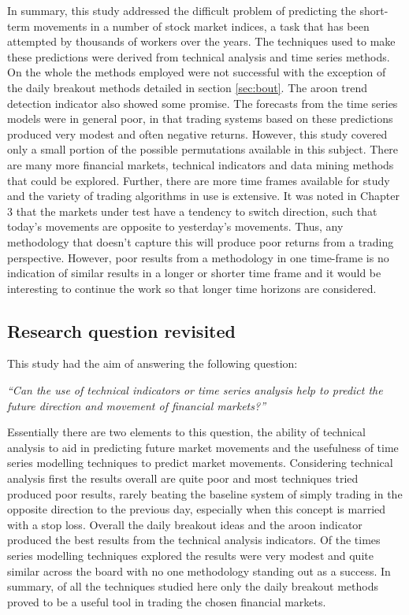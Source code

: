 In summary, this study addressed the difficult problem of predicting the short-term movements in a number of stock market indices, a task that has been attempted by thousands of workers over the years. The techniques used to make these predictions were derived from technical analysis and time series methods. On the whole the methods employed were not successful with the exception of the daily breakout methods detailed in section \ref{sec:bout}. The aroon trend detection indicator also showed some promise. The forecasts from the time series models were in general poor, in that trading systems based on these predictions produced very modest and often negative returns. However, this study covered only a small portion of the possible permutations available in this subject. There are many more financial markets, technical indicators and data mining methods that could be explored. Further, there are more time frames available for study and the variety of trading algorithms in use is extensive. It was noted in Chapter 3 that the markets under test have a tendency to switch direction, such that today's movements are opposite to yesterday's movements. Thus, any methodology that doesn't capture this will produce poor returns from a trading perspective. However, poor results from a methodology in one time-frame is no indication of similar results in a longer or shorter time frame and it would be interesting to continue the work so that longer time horizons are considered.

\subsection{Research question revisited}
This study had the aim of answering the following question:

\textit{\textquotedblleft Can the use of technical indicators or time series analysis help to predict the future direction and movement of financial markets?\textquotedblright}

Essentially there are two elements to this question, the ability of technical analysis to aid in predicting future market movements and the usefulness of time series modelling techniques to predict market movements. Considering technical analysis first the results overall are quite poor and most techniques tried produced poor results, rarely beating the baseline system of simply trading in the opposite direction to the previous day, especially when this concept is married with a stop loss. Overall the daily breakout ideas and the aroon indicator produced the best results from the technical analysis indicators. Of the times series modelling techniques explored the results were very modest and quite similar across the board with no one methodology standing out as a success. In summary, of all the techniques studied here only the daily breakout methods proved to be a useful tool in trading the chosen financial markets.

